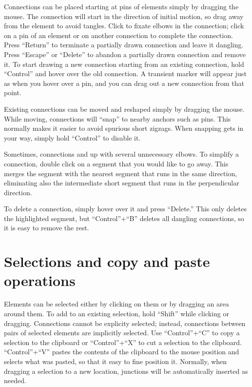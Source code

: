 \documentclass[11pt]{report}
\begin{document}
Connections can be placed starting at pins of elements simply by
dragging the mouse. The connection will start in the direction of
initial motion, so drag away from the element to avoid tangles. Click
to fixate elbows in the connection; click on a pin of an element or on
another connection to complete the connection. Press ``Return'' to
terminate a partially drawn connection and leave it dangling. Press
``Escape'' or ``Delete'' to abandon a partially drawn connection and
remove it. To start drawing a new connection starting from an existing
connection, hold ``Control'' and hover over the old connection. A
transient marker will appear just as when you hover over a pin, and
you can drag out a new connection from that point.

Existing connections can be
moved and reshaped simply by dragging the mouse. While moving,
connections will ``snap'' to nearby anchors such as pins. This
normally makes it easier to avoid spurious short zigzags. When
snapping gets in your way, simply hold ``Control'' to disable it.

Sometimes, connections and up with several unnecessary elbows. To
simplify a connection, double click on a segment that you would like
to go away. This merges the segment with the nearest segment that runs
in the same direction, eliminating also the intermediate short segment
that runs in the perpendicular direction.

To delete a connection, simply hover over it and press ``Delete.''
This only deletes the highlighted segment, but ``Control''+``B''
deletes all dangling connections, so it is easy to remove the rest.

\section{Selections and copy and paste operations}

Elements can be selected either by clicking on them or by dragging an
area around them. To add to an existing selection, hold ``Shift''
while clicking or dragging. Connections cannot be explicity selected;
instead, connections between pairs of selected elements are implicitly
selected. Use ``Control''+``C'' to copy a selection to the clipboard
or ``Control''+``X'' to cut a selection to the
clipboard. ``Control''+``V'' pastes the contents of the clipboard to
the mouse position and selects what was pasted, so that it easy to
fine position it. Normally, when dragging a selection to a new
location, junctions will be automatically inserted as needed.
\end{document}
